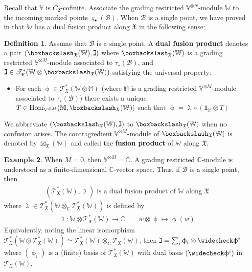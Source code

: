 \documentclass[11pt,b5paper,notitlepage]{article}
\theoremstyle{definition}
\newtheorem{df}{Definition}[subsection]
\newtheorem{eg}[df]{Example}
\theoremstyle{plain}
\newcommand{\wch}{\widecheck}
\newcommand{\idt}{\mathbf{1}}
\newcommand{\Hom}{\mathrm{Hom}}
\newcommand{\scr}{\mathscr}
\newcommand{\sgm}{\varsigma}
\newcommand{\blt}{\bullet}
\newcommand{\Vbb}{\mathbb V}
\newcommand{\Wbb}{\mathbb W}
\newcommand{\Mbb}{\mathbb M}
\newcommand{\Cbb}{\mathbb C}
\newcommand{\<}{\left\langle}
\renewcommand{\>}{\right\rangle}
\newcommand{\MB}{\mathcal{B}}
\newcommand{\fx}{\mathfrak{X}}
\newcommand{\bbs}{\boxbackslash}
\numberwithin{equation}{subsection}
\begin{document}
Recall that $\Vbb$ is $C_2$-cofinite. Associate the grading restricted $\Vbb^{\otimes N}$-module $\Wbb$ to the incoming marked points $\sgm_\blt(\MB)$. When $\MB$ is a single point, we have proved in \cite[Thm. 3.5.5]{GZ1} that $\Wbb$ has a dual fusion product along $\fx$ in the following sense:

\begin{df}\label{lbb36}
Assume that $\MB$ is a single point. A \textbf{dual fusion product} denotes a pair $(\bbs_\fx(\Wbb),\gimel)$ where $\bbs_\fx(\Wbb)$ is a grading restricted $\Vbb^{\otimes M}$-module associated to $\tau_\star(\MB)$, and $\gimel\in\scr T_\fx^*(\Wbb\otimes\bbs_\fx(\Wbb))$ satisfying the universal property:
\begin{itemize}
\item For each $\upphi\in\scr T_\fx^*(\Wbb\otimes\Mbb)$ (where $\Mbb$ is a grading restricted $\Vbb^{\otimes M}$-module associated to $\tau_\star(\MB)$) there exists a unique $T\in\Hom_{V^{\otimes M}}(\Mbb,\bbs_\fx(\Wbb))$ such that $\upphi=\gimel\circ(\idt_\Mbb\otimes T)$
\end{itemize}
We abbreviate $(\bbs_\fx(\Wbb),\gimel)$ to $\bbs_\fx(\Wbb)$ when no confusion arises. The contragredient $\Vbb^{\otimes M}$-module of $\bbs_\fx(\Wbb)$ is denoted by $\boxtimes_\fx(\Wbb)$ and called the \textbf{fusion product} of $\Wbb$ along $\fx$.
\end{df}

\begin{eg}
When $M=0$, then $\Vbb^{\otimes M}=\Cbb$. A grading restricted $\Cbb$-module is understood as a finite-dimensional $\Cbb$-vector space. Thus, if $\MB$ is a single point, then
\begin{align*}
(\scr T_\fx^*(\Wbb),\gimel)\text{ is a dual fusion product of $\Wbb$ along $\fx$}
\end{align*}
where $\gimel\in \scr T_\fx^*(\Wbb\otimes_\Cbb\scr T_\fx^*(\Wbb))$ is defined by
\begin{align*}
\gimel:\Wbb\otimes\scr T_\fx^*(\Wbb)\rightarrow\Cbb\qquad w\otimes\upphi\mapsto\upphi(w)
\end{align*}
Equivalently, noting the linear isomorphism $\scr T_\fx^*(\Wbb\otimes\scr T_\fx^*(\Wbb))\simeq \scr T_\fx^*(\Wbb)\otimes_\Cbb \scr T_\fx(\Wbb)$, then $\gimel=\sum_i\upphi_i\otimes\wch\upphi^i$ where $(\upphi_i)$ is a (finite) basis of $\scr T_\fx^*(\Wbb)$ with dual basis $(\wch\upphi^i)$ in $\scr T_\fx(\Wbb)$.
\end{eg}
\end{document}
